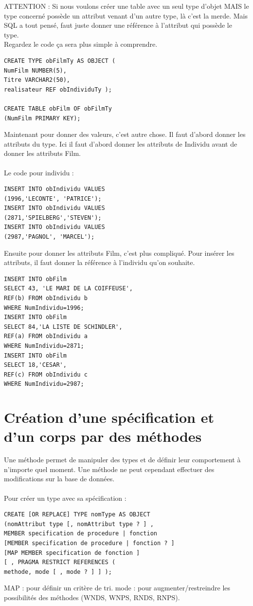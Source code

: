 \documentclass{report}
\begin{document}
ATTENTION : Si nous voulons créer une table avec un seul type d'objet MAIS le type concerné possède un attribut venant d'un autre type, là c'est la merde. Mais SQL a tout pensé, faut juste donner une référence à l'attribut qui possède le type. \\
Regardez le code ça sera plus simple à comprendre.
\begin{lstlisting}[style=MySQLStyle]
CREATE TYPE obFilmTy AS OBJECT (
NumFilm NUMBER(5),
Titre VARCHAR2(50),
realisateur REF obIndividuTy );

CREATE TABLE obFilm OF obFilmTy
(NumFilm PRIMARY KEY);
\end{lstlisting}

Maintenant pour donner des valeurs, c'est autre chose. Il faut d'abord donner les attributs du type. Ici il faut d'abord donner les attributs de Individu avant de donner les attributs Film.\\ \\
Le code pour individu :
\begin{lstlisting}[style=MySQLStyle]
INSERT INTO obIndividu VALUES
(1996,'LECONTE', 'PATRICE');
INSERT INTO obIndividu VALUES
(2871,'SPIELBERG','STEVEN');
INSERT INTO obIndividu VALUES
(2987,'PAGNOL', 'MARCEL');
\end{lstlisting}
Ensuite pour donner les attributs Film, c'est plus compliqué. Pour insérer les attributs, il faut donner la référence à l'individu qu'on souhaite. 
\begin{lstlisting}[style=MySQLStyle]
INSERT INTO obFilm
SELECT 43, 'LE MARI DE LA COIFFEUSE',
REF(b) FROM obIndividu b
WHERE NumIndividu=1996;
INSERT INTO obFilm
SELECT 84,'LA LISTE DE SCHINDLER',
REF(a) FROM obIndividu a
WHERE NumIndividu=2871;
INSERT INTO obFilm
SELECT 18,'CESAR',
REF(c) FROM obIndividu c
WHERE NumIndividu=2987;
\end{lstlisting}

\section{Création d'une spécification et d'un corps par des méthodes}
Une méthode permet de manipuler des types et de définir leur comportement à n'importe quel moment. Une méthode ne peut cependant effectuer des modifications sur la base de données.\\ \\

Pour créer un type avec sa spécification :
\begin{lstlisting}[style=MySQLStyle]
CREATE [OR REPLACE] TYPE nomType AS OBJECT
(nomAttribut type [, nomAttribut type ? ] ,
MEMBER specification de procedure | fonction
[MEMBER specification de procedure | fonction ? ]
[MAP MEMBER specification de fonction ]
[ , PRAGMA RESTRICT REFERENCES (
methode, mode [ , mode ? ] ] );
\end{lstlisting}
MAP : pour définir un critère de tri.
mode : pour augmenter/restreindre les possibilités des méthodes
(WNDS, WNPS, RNDS, RNPS).\\ \\
\end{document}
